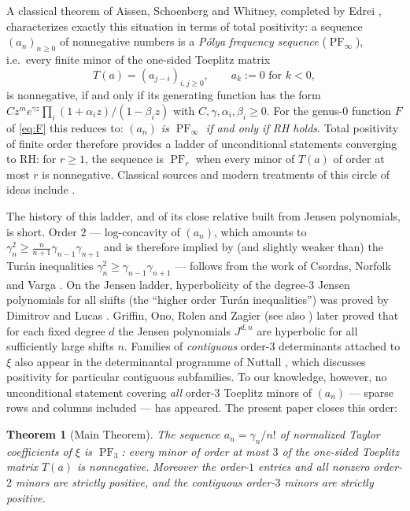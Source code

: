 \documentclass[11pt]{amsart}
\newtheorem{theorem}{Theorem}[section]
\theoremstyle{definition}
\theoremstyle{remark}
\DeclareMathOperator{\PF}{PF}
\begin{document}
A classical theorem of Aissen, Schoenberg and Whitney, completed by
Edrei \cite{ASW52,Edrei52}, characterizes exactly this situation in
terms of total positivity: a sequence $(a_n)_{n\ge0}$ of nonnegative
numbers is a \emph{P\'olya frequency sequence} ($\PF_\infty$), i.e.\
every finite minor of the one-sided Toeplitz matrix
\[
T(a)=(a_{j-i})_{i,j\ge 0},\qquad a_k:=0 \text{ for } k<0,
\]
is nonnegative, if and only if its generating function has the form
$C z^m e^{\gamma z}\prod_i (1+\alpha_i z)/(1-\beta_i z)$ with
$C,\gamma,\alpha_i,\beta_i\ge 0$. For the genus-$0$ function $F$ of
\eqref{eq:F} this reduces to: \emph{$(a_n)$ is $\PF_\infty$ if and only
if RH holds}. Total positivity of finite order therefore provides a
ladder of unconditional statements converging to RH: for $r\ge 1$, the
sequence is $\PF_r$ when every minor of $T(a)$ of order at most $r$ is
nonnegative.
Classical sources and modern treatments of this circle of ideas include
\cite{Fekete13,Hutchinson23,Karlin68,Pinkus10,PolyaCollected}.

The history of this ladder, and of its close relative built from Jensen
polynomials, is short. Order $2$ --- log-concavity of $(a_n)$, which
amounts to $\gamma_n^{2}\ge\frac{n}{n+1}\gamma_{n-1}\gamma_{n+1}$ and
is therefore implied by (and slightly weaker than) the Tur\'an
inequalities $\gamma_n^{2}\ge\gamma_{n-1}\gamma_{n+1}$ --- follows from
the work of Csordas, Norfolk and Varga \cite{CNV86}. On the
Jensen ladder, hyperbolicity of the degree-$3$ Jensen polynomials for
all shifts (the ``higher order Tur\'an inequalities'') was proved by
Dimitrov and Lucas \cite{DL11}. Griffin, Ono, Rolen and Zagier
\cite{GORZ19} (see also \cite{GORTTW,OSullivan}) later proved that for
each fixed degree $d$ the Jensen polynomials $J^{d,n}$ are hyperbolic
for all sufficiently large shifts $n$. Families of \emph{contiguous}
order-$3$ determinants attached to $\xi$ also appear in the
determinantal programme of Nuttall \cite{Nuttall11}, which discusses
positivity for particular contiguous subfamilies. To our knowledge,
however, no unconditional statement covering \emph{all} order-$3$
Toeplitz minors of $(a_n)$ --- sparse rows and columns included ---
has appeared. The present paper closes this order:

\begin{theorem}[Main Theorem]\label{thm:main}
The sequence $a_n=\gamma_n/n!$ of normalized Taylor coefficients of
$\xi$ is $\PF_3$: every minor of order at most $3$ of the one-sided
Toeplitz matrix $T(a)$ is nonnegative. Moreover the order-$1$ entries
and all nonzero order-$2$ minors are strictly positive, and the
contiguous order-$3$ minors are strictly positive.
\end{theorem}
\end{document}
